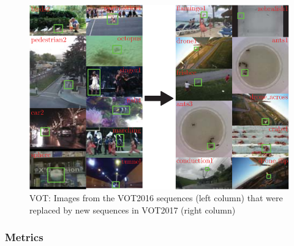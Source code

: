 \documentclass{bmvc2k}
\begin{document}
\begin{itemize}
\begin{itemize}
\begin{figure}[h!]
\begin{center}
\includegraphics[scale=0.3]{vot.png}
\caption{VOT: Images from the VOT2016 sequences (left column) that were replaced by new sequences in VOT2017 (right column) ~\cite{kristan2017visual}}
\label{fig:vot}
\end{center}
\end{figure}
\end{itemize}
\end{itemize}
\subsubsection{Metrics}
\end{document}
